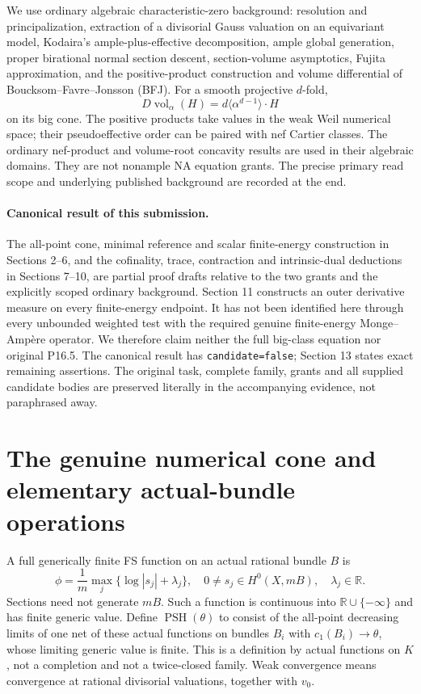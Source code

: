 \documentclass[10pt]{article}
\newcommand{\PSH}{\operatorname{PSH}}
\newcommand{\vol}{\operatorname{vol}}
\begin{document}
We use ordinary algebraic characteristic-zero background: resolution and
principalization, extraction of a divisorial Gauss valuation on an equivariant
model, Kodaira's ample-plus-effective decomposition, ample global generation,
proper birational normal section descent, section-volume asymptotics, Fujita
approximation, and the positive-product construction and volume differential
of Boucksom--Favre--Jonsson (BFJ). For a smooth projective $d$-fold,
\[
 D\vol_\alpha(H)=d\langle\alpha^{d-1}\rangle\cdot H
\]
on its big cone. The positive products take values in the weak Weil numerical
space; their pseudoeffective order can be paired with nef Cartier classes.
The ordinary nef-product and volume-root concavity results are used in their
algebraic domains. They are not nonample NA equation grants. The precise
primary read scope and underlying published background are recorded at the end.

\paragraph{Canonical result of this submission.}
The all-point cone, minimal reference and scalar finite-energy construction in
Sections 2--6, and the cofinality, trace, contraction and intrinsic-dual
deductions in Sections 7--10, are partial proof drafts relative to the two
grants and the explicitly scoped ordinary background. Section 11 constructs
an outer derivative measure on every finite-energy endpoint. It has not been
identified here through every unbounded weighted test with the required
genuine finite-energy Monge--Amp\`ere operator. We therefore claim neither the
full big-class equation nor original P16.5. The canonical result has
\texttt{candidate=false}; Section 13 states exact remaining assertions.
The original task, complete family, grants and all supplied candidate bodies
are preserved literally in the accompanying evidence, not paraphrased away.

\section{The genuine numerical cone and elementary actual-bundle operations}
A full generically finite FS function on an actual rational bundle $B$ is
\[
 \phi=\frac1m\max_j\{\log|s_j|+\lambda_j\},\quad
 0\ne s_j\in H^0(X,mB),\quad\lambda_j\in\mathbb R.
\]
Sections need not generate $mB$. Such a function is continuous into
$\mathbb R\cup\{-\infty\}$ and has finite generic value. Define
$\PSH(\theta)$ to consist of the all-point decreasing limits of one net of
these actual functions on bundles $B_i$ with $c_1(B_i)\to\theta$, whose
limiting generic value is finite. This is a definition by actual functions on
$K$, not a completion and not a twice-closed family. Weak convergence means
convergence at rational divisorial valuations, together with $v_0$.
\end{document}
